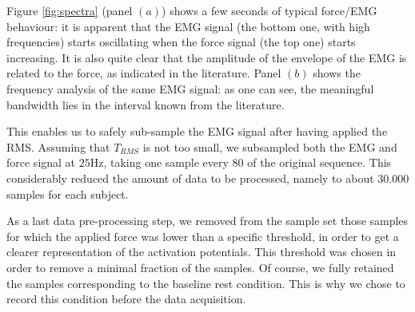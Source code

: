 Figure \ref{fig:spectra} (panel $(a)$) shows a few seconds of typical
force/EMG behaviour: it is apparent that the EMG signal (the bottom
one, with high frequencies) starts oscillating when the force signal
(the top one) starts increasing. It is also quite clear that the
amplitude of the envelope of the EMG is related to the force, as
indicated in the literature. Panel $(b)$ shows the frequency analysis
of the same EMG signal: as one can see, the meaningful bandwidth lies
in the interval known from the literature.


This enables us to safely sub-sample the EMG signal after having
applied the RMS. Assuming that $T_{RMS}$ is not too small, we
subsampled both the EMG and force signal at $25$Hz, taking one sample
every $80$ of the original sequence.  This considerably reduced the
amount of data to be processed, namely to about $30.000$ samples for
each subject.

As a last data pre-processing step, we removed from the sample set
those samples for which the applied force was lower than a specific
threshold, in order to get a clearer representation of the activation
potentials. This threshold was chosen in order to remove a minimal
fraction of the samples. Of course, we fully retained the samples
corresponding to the baseline rest condition.  This is why we chose to
record this condition before the data acquisition.
